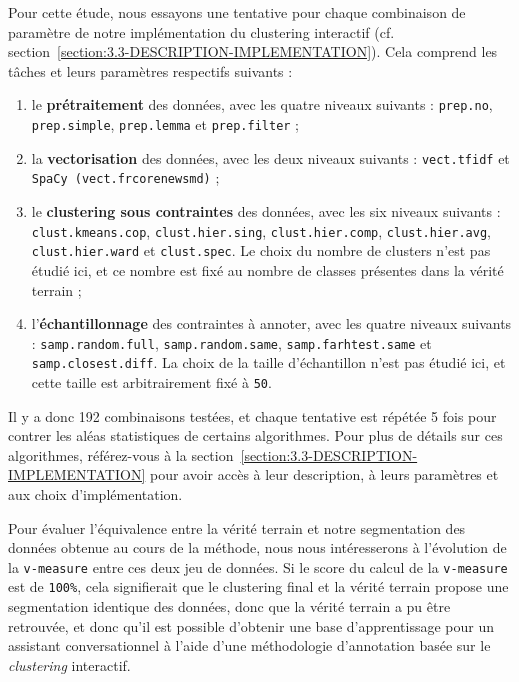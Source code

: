 				Pour cette étude, nous essayons une tentative pour chaque combinaison de paramètre de notre implémentation du clustering interactif (cf. section~\ref{section:3.3-DESCRIPTION-IMPLEMENTATION}). Cela comprend les tâches et leurs paramètres respectifs suivants :
				\begin{enumerate}
					\item le \textbf{prétraitement} des données, avec les quatre niveaux suivants : \texttt{prep.no}, \texttt{prep.simple}, \texttt{prep.lemma} et \texttt{prep.filter} ;
					\item la \textbf{vectorisation} des données, avec les deux niveaux suivants : \texttt{vect.tfidf} et \texttt{SpaCy (vect.frcorenewsmd)} ;
					\item le \textbf{clustering sous contraintes} des données, avec les six niveaux suivants : \texttt{clust.kmeans.cop}, \texttt{clust.hier.sing}, \texttt{clust.hier.comp}, \texttt{clust.hier.avg}, \texttt{clust.hier.ward} et \texttt{clust.spec}. Le choix du nombre de clusters n'est pas étudié ici, et ce nombre est fixé au nombre de classes présentes dans la vérité terrain ;
					\item l'\textbf{échantillonnage} des contraintes à annoter, avec les quatre niveaux suivants : \texttt{samp.random.full}, \texttt{samp.random.same}, \texttt{samp.farhtest.same} et \texttt{samp.closest.diff}. La choix de la taille d'échantillon n'est pas étudié ici, et cette taille est arbitrairement fixé à \texttt{50}.
				\end{enumerate}
				
				Il y a donc 192 combinaisons testées, et chaque tentative est répétée 5 fois pour contrer les aléas statistiques de certains algorithmes.
				Pour plus de détails sur ces algorithmes, référez-vous à la section~\ref{section:3.3-DESCRIPTION-IMPLEMENTATION} pour avoir accès à leur description, à leurs paramètres et aux choix d'implémentation.
				
				Pour évaluer l'équivalence entre la vérité terrain et notre segmentation des données obtenue au cours de la méthode, nous nous intéresserons à l'évolution de la \texttt{v-measure} entre ces deux jeu de données.
				Si le score du calcul de la \texttt{v-measure} est de \texttt{100\%}, cela signifierait que le clustering final et la vérité terrain propose une segmentation identique des données, donc que la vérité terrain a pu être retrouvée, et donc qu'il est possible d'obtenir une base d'apprentissage pour un assistant conversationnel à l'aide d'une méthodologie d'annotation basée sur le \textit{clustering} interactif.
				
